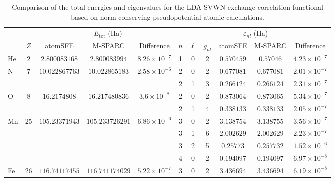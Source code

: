 \begin{table}[!htbp]
    \centering
    \footnotesize
    \setlength{\tabcolsep}{3pt}
    \renewcommand{\arraystretch}{0.9}
    \caption{Comparison of the total energies and eigenvalues for the LDA-SVWN exchange-correlation functional based on norm-conserving pseudopotential atomic calculations.}
    \label{tab:pseudo-lda-svwn-eigs}
    \begin{tabular}{@{}l c ccc ccc ccc@{}}
        \toprule
        & & \multicolumn{3}{c}{$-E_{\mathrm{tot}}$ (Ha)} & \multicolumn{6}{c}{$-\varepsilon_{nl}$ (Ha)} \\
        \cmidrule(lr){3-5} \cmidrule(lr){6-11}
         & $Z$ & atomSFE & M-SPARC & Difference & $n$ & $\ell$ & $g_{nl}$ & atomSFE & M-SPARC & Difference \\
        \midrule
        \multirow[t]{1}{*}{He} & \multirow[t]{1}{*}{2} & \multirow[t]{1}{*}{$2.800083168$} & \multirow[t]{1}{*}{$2.800083994$} & \multirow[t]{1}{*}{$8.26 \times 10^{-7}$} & 1 & 0 & 2 & $0.570459$ & $0.57046$ & $4.23 \times 10^{-7}$ \\
        \multirow[t]{2}{*}{N} & \multirow[t]{2}{*}{7} & \multirow[t]{2}{*}{$10.022867763$} & \multirow[t]{2}{*}{$10.022865183$} & \multirow[t]{2}{*}{$2.58 \times 10^{-6}$} & 2 & 0 & 2 & $0.677081$ & $0.677081$ & $2.01 \times 10^{-7}$ \\
         &  &  &  &  & 2 & 1 & 3 & $0.266124$ & $0.266124$ & $2.31 \times 10^{-7}$ \\
        \multirow[t]{2}{*}{O} & \multirow[t]{2}{*}{8} & \multirow[t]{2}{*}{$16.2174808$} & \multirow[t]{2}{*}{$16.217480836$} & \multirow[t]{2}{*}{$3.6 \times 10^{-8}$} & 2 & 0 & 2 & $0.873064$ & $0.873065$ & $5.34 \times 10^{-7}$ \\
         &  &  &  &  & 2 & 1 & 4 & $0.338133$ & $0.338133$ & $2.05 \times 10^{-7}$ \\
        \multirow[t]{4}{*}{Mn} & \multirow[t]{4}{*}{25} & \multirow[t]{4}{*}{$105.23371943$} & \multirow[t]{4}{*}{$105.233726291$} & \multirow[t]{4}{*}{$6.86 \times 10^{-6}$} & 3 & 0 & 2 & $3.138754$ & $3.138755$ & $3.56 \times 10^{-7}$ \\
         &  &  &  &  & 3 & 1 & 6 & $2.002629$ & $2.002629$ & $2.23 \times 10^{-7}$ \\
         &  &  &  &  & 3 & 2 & 5 & $0.25773$ & $0.257732$ & $1.52 \times 10^{-6}$ \\
         &  &  &  &  & 4 & 0 & 2 & $0.194097$ & $0.194097$ & $6.97 \times 10^{-8}$ \\
        \multirow[t]{4}{*}{Fe} & \multirow[t]{4}{*}{26} & \multirow[t]{4}{*}{$116.74117455$} & \multirow[t]{4}{*}{$116.741174029$} & \multirow[t]{4}{*}{$5.22 \times 10^{-7}$} & 3 & 0 & 2 & $3.436694$ & $3.436694$ & $6.19 \times 10^{-8}$ \\

\end{tabular}
\end{table}
